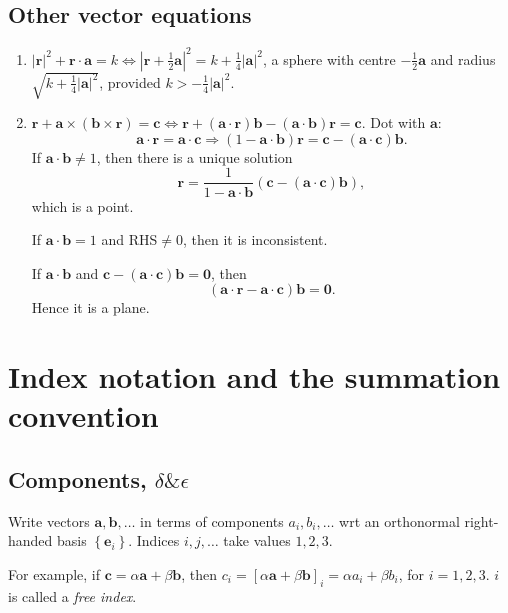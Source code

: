 \documentclass[10pt]{article}
\begin{document}
    \subsection{Other vector equations}
    \begin{enumerate}[(1)]
        \item $ |\mathbf{r}|^2+\mathbf{r}\cdot \mathbf{a}=k \Leftrightarrow \left| \mathbf{r}+\frac{1}{2}\mathbf{a} \right|^2=k+\frac{1}{4}|\mathbf{a}|^2  $, a sphere with centre $ -\frac{1}{2}\mathbf{a} $ and radius $ \sqrt{k+\frac{1}{4}|\mathbf{a}|^2} $, provided $ k>-\frac{1}{4}|\mathbf{a}|^2 $.
        \item $ \mathbf{r}+\mathbf{a} \times (\mathbf{b}\times \mathbf{r}) =\mathbf{c} \Leftrightarrow \mathbf{r}+(\mathbf{a}\cdot \mathbf{r})\mathbf{b}-(\mathbf{a}\cdot \mathbf{b})\mathbf{r}=\mathbf{c}$. Dot with $\mathbf{a}$:
        \[
            \mathbf{a}\cdot \mathbf{r}= \mathbf{a}\cdot \mathbf{c} \Longrightarrow (1-\mathbf{a}\cdot \mathbf{b})\mathbf{r}=\mathbf{c}-(\mathbf{a}\cdot \mathbf{c})\mathbf{b}
        .\]
        If $ \mathbf{a}\cdot \mathbf{b}\neq 1 $, then there is a unique solution
        \[
            \mathbf{r} = \frac{1}{1-\mathbf{a}\cdot \mathbf{b}}(\mathbf{c}-(\mathbf{a}\cdot \mathbf{c})\mathbf{b})
        ,\]
        which is a point.

        If $ \mathbf{a}\cdot \mathbf{b}=1 $ and RHS$\neq 0$, then it is inconsistent.

        If $ \mathbf{a}\cdot \mathbf{b} $ and $\mathbf{c}-(\mathbf{a}\cdot \mathbf{c})\mathbf{b}=\mathbf{0}$, then 
        \[
            (\mathbf{a}\cdot \mathbf{r}-\mathbf{a}\cdot \mathbf{c})\mathbf{b}=\mathbf{0}
        .\] 
        Hence it is a plane.
    \end{enumerate}
    \section{Index notation and the summation convention}
    \subsection{Components, $\delta\& \epsilon$}
    Write vectors $ \mathbf{a},\mathbf{b},\dots $ in terms of components $ a_i,b_i,\dots $ wrt an orthonormal right-handed basis $ \left\{ \mathbf{e}_i\right\} $. Indices $i,j,\dots$ take values $1,2,3$.

    For example, if $ \mathbf{c}=\alpha \mathbf{a}+\beta \mathbf{b} $, then $ c_i=[\alpha \mathbf{a}+\beta \mathbf{b}]_i=\alpha a_i+\beta b_i $, for $i=1,2,3$. $i$ is called a \textit{free index}.
\end{document}
